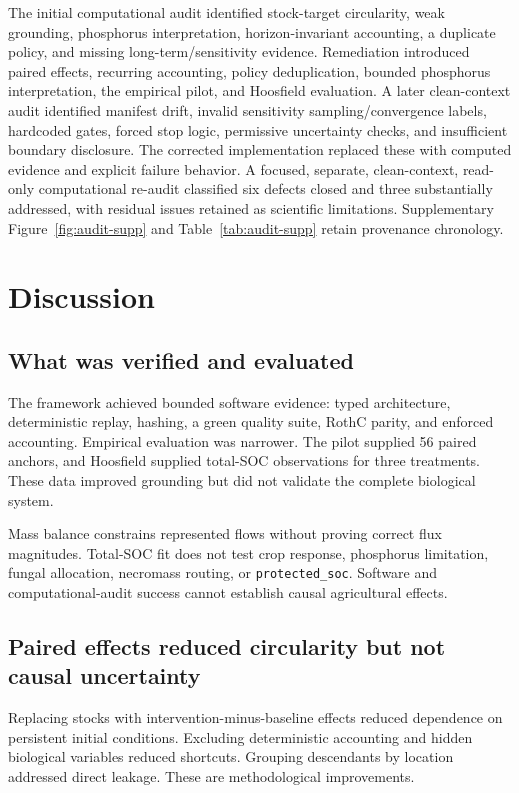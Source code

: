 \documentclass[11pt]{article}
\newcommand{\protectedSOC}{\texttt{protected\_soc}}
\begin{document}
The initial computational audit identified stock-target circularity, weak grounding, phosphorus interpretation, horizon-invariant accounting, a duplicate policy, and missing long-term/sensitivity evidence. Remediation introduced paired effects, recurring accounting, policy deduplication, bounded phosphorus interpretation, the empirical pilot, and Hoosfield evaluation. A later clean-context audit identified manifest drift, invalid sensitivity sampling/convergence labels, hardcoded gates, forced stop logic, permissive uncertainty checks, and insufficient boundary disclosure. The corrected implementation replaced these with computed evidence and explicit failure behavior. A focused, separate, clean-context, read-only computational re-audit classified six defects closed and three substantially addressed, with residual issues retained as scientific limitations. Supplementary Figure~\ref{fig:audit-supp} and Table~\ref{tab:audit-supp} retain provenance chronology.

\section{Discussion}

\subsection{What was verified and evaluated}

The framework achieved bounded software evidence: typed architecture, deterministic replay, hashing, a green quality suite, RothC parity, and enforced accounting. Empirical evaluation was narrower. The pilot supplied 56 paired anchors, and Hoosfield supplied total-SOC observations for three treatments. These data improved grounding but did not validate the complete biological system.

Mass balance constrains represented flows without proving correct flux magnitudes. Total-SOC fit does not test crop response, phosphorus limitation, fungal allocation, necromass routing, or \protectedSOC{}. Software and computational-audit success cannot establish causal agricultural effects.

\subsection{Paired effects reduced circularity but not causal uncertainty}

Replacing stocks with intervention-minus-baseline effects reduced dependence on persistent initial conditions. Excluding deterministic accounting and hidden biological variables reduced shortcuts. Grouping descendants by location addressed direct leakage. These are methodological improvements.
\end{document}
